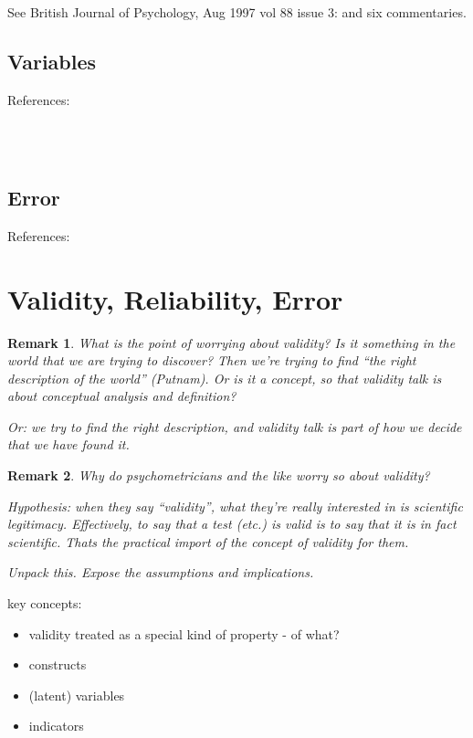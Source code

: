 \documentclass[11pt,twoside]{article}
\newtheorem{remark}{Remark}
\begin{document}
See British Journal of Psychology, Aug 1997 vol 88 issue 3:
\cite{michell_quantitative_1997} and six commentaries.

\subsection{Variables}

References:

\noindent
\cite{schwarz_is_2009}\\
\cite{toomela_variables_2008}\\
\cite{stam_fault_2010}

\subsection{Error}

References:

\noindent
\cite{smith_refining_2011}

\clearpage
\section{Validity, Reliability, Error}
\label{sub:Validity}

\begin{remark}
What is the point of worrying about validity?  Is it something in the
world that we are trying to discover?  Then we're trying to find ``the
right description of the world'' (Putnam).  Or is it a concept, so
that validity talk is about conceptual analysis and definition?

Or: we try to find the right description, and validity talk is part of
how we decide that we have found it.

\end{remark}

\begin{remark}
Why do psychometricians and the like worry so about validity?

Hypothesis: when they say ``validity'', what they're really interested
in is scientific legitimacy.  Effectively, to say that a test (etc.)
is valid is to say that it is in fact scientific.  Thats the practical
import of the concept of validity for them.

Unpack this.  Expose the assumptions and implications.
\end{remark}

key concepts:

\begin{itemize}
\item validity treated as a special kind of property - of what?
\item constructs
\item (latent) variables
\item indicators
\end{itemize}
\end{document}
